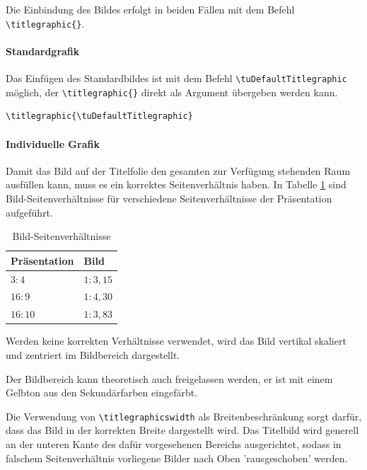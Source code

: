 \documentclass[cmyk,a4paper,colorscheme=green,TUBStitlepage=picture]{tubsreprt}
\begin{document}
Die Einbindung des Bildes erfolgt in beiden Fällen mit dem Befehl
\lstinline!\titlegraphic{}!.

\paragraph{Standardgrafik}

Das Einfügen des Standardbildes ist mit dem Befehl
\linebreak\lstinline{\tuDefaultTitlegraphic} möglich,
der \lstinline!\titlegraphic{}! direkt als Argument übergeben werden kann.

\begin{example}
\begin{lstlisting}
\titlegraphic{\tuDefaultTitlegraphic}
\end{lstlisting}
\end{example}

\paragraph{Individuelle Grafik}

Damit das Bild auf der Titelfolie den gesamten zur Verfügung stehenden Raum
ausfüllen kann, muss es ein korrektes Seitenverhältnis haben.
In Tabelle \ref{tab:picratio} sind Bild-Seiten\-verhältnisse für verschiedene
Seitenverhältnisse der Präsentation aufgeführt.

\begin{table}[ht]
\centering
\begin{tabular}{ll}
\toprule
\bfseries Präsentation  & \bfseries  Bild  \\
\midrule
$3:4$   & $1:3,15$ \\
$16:9$  & $1:4,30$ \\
$16:10$ & $1:3,83$ \\
\bottomrule
\end{tabular}
\caption{Bild-Seitenverhältnisse}
\label{tab:picratio}
\end{table}

Werden keine korrekten Verhältnisse verwendet, wird das Bild vertikal
skaliert und zentriert im Bildbereich dargestellt.

Der Bildbereich kann theoretisch auch freigelassen werden, er ist mit
einem Gelbton aus den Sekundärfarben eingefärbt.\medskip

Die Verwendung von \lstinline{\titlegraphicswidth} als Breitenbeschränkung sorgt
darfür, dass das Bild in der korrekten Breite dargestellt wird. Das Titelbild 
wird generell an der unteren Kante des dafür vorgesehenen Bereichs ausgerichtet,
sodass in falschem Seitenverhältnis vorliegene Bilder nach Oben 'rausgeschoben'
werden.
\end{document}
